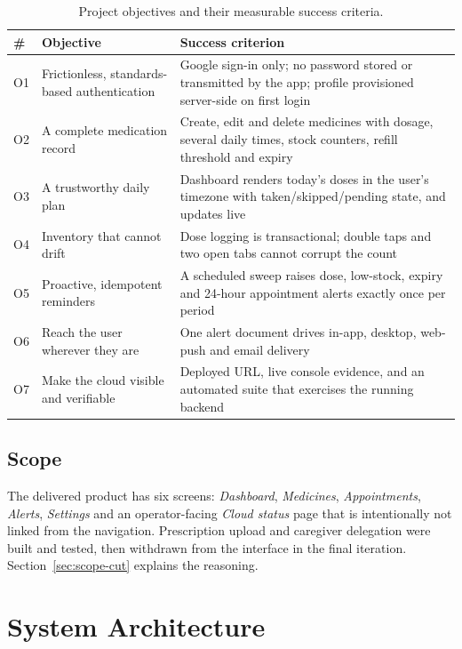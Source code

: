 \documentclass[11pt,a4paper]{report}
\begin{document}
\begin{table}[H]
\centering
\caption{Project objectives and their measurable success criteria.}
\label{tab:objectives}
\small
\begin{tabularx}{\textwidth}{@{}l X X@{}}
\toprule
\textbf{\#} & \textbf{Objective} & \textbf{Success criterion} \\
\midrule
O1 & Frictionless, standards-based authentication & Google sign-in only; no password stored or transmitted by the app; profile provisioned server-side on first login \\
O2 & A complete medication record & Create, edit and delete medicines with dosage, several daily times, stock counters, refill threshold and expiry \\
O3 & A trustworthy daily plan & Dashboard renders today's doses in the user's timezone with taken/skipped/pending state, and updates live \\
O4 & Inventory that cannot drift & Dose logging is transactional; double taps and two open tabs cannot corrupt the count \\
O5 & Proactive, idempotent reminders & A scheduled sweep raises dose, low-stock, expiry and 24-hour appointment alerts exactly once per period \\
O6 & Reach the user wherever they are & One alert document drives in-app, desktop, web-push and email delivery \\
O7 & Make the cloud visible and verifiable & Deployed URL, live console evidence, and an automated suite that exercises the running backend \\
\bottomrule
\end{tabularx}
\end{table}

\section{Scope}

The delivered product has six screens: \emph{Dashboard}, \emph{Medicines}, \emph{Appointments},
\emph{Alerts}, \emph{Settings} and an operator-facing \emph{Cloud status} page that is intentionally not
linked from the navigation. Prescription upload and caregiver delegation were built and tested, then
withdrawn from the interface in the final iteration. Section~\ref{sec:scope-cut} explains the reasoning.

\chapter{System Architecture}
\end{document}
